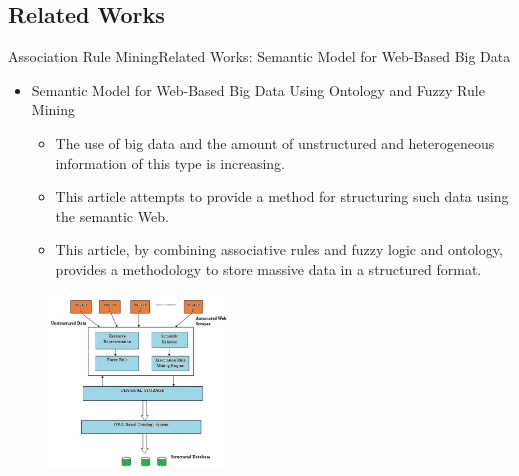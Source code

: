 \documentclass[10pt]{beamer}
\begin{document}
\subsection{Related Works}

\begin{frame}{Association Rule Mining}{Related Works: Semantic Model for Web-Based Big Data}
\begin{itemize}
\item Semantic Model for Web-Based Big Data Using Ontology and Fuzzy Rule Mining \cite{das2016semantic}
\begin{itemize}
\item The use of big data and the amount of unstructured and heterogeneous information of this type is increasing.
\item  This article attempts to provide a method for structuring such data using the semantic Web.
\item This article, by combining associative rules and fuzzy logic and ontology, provides a methodology to store massive data in a structured format.
\end{itemize}
\end{itemize}
\begin{figure}[H]
	\centering
	\includegraphics[width=0.43\textwidth]{images/Methodology.PNG}
	\label{fig:Methodology}
\end{figure}
\end{frame}
\end{document}
